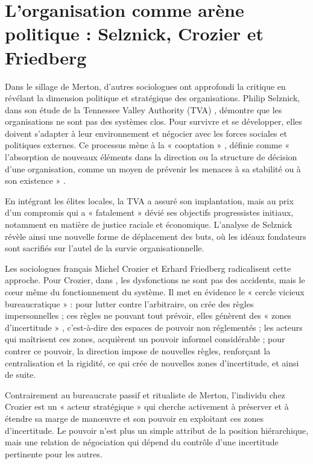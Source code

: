 \section{L'organisation comme arène politique : Selznick, Crozier et Friedberg}

Dans le sillage de Merton, d'autres sociologues ont approfondi la critique en révélant la dimension politique et stratégique des organisations.
Philip Selznick, dans son étude de la Tennessee Valley Authority (TVA) \citep{Selznick1949}, démontre que les organisations ne sont pas des systèmes clos. Pour survivre et se développer, elles doivent s'adapter à leur environnement et négocier avec les forces sociales et politiques externes. Ce processus mène à la « cooptation » , définie comme « l'absorption de nouveaux éléments dans la direction ou la structure de décision d'une organisation, comme un moyen de prévenir les menaces à sa stabilité ou à son existence » .

En intégrant les élites locales, la TVA a assuré son implantation, mais au prix d'un compromis qui a « fatalement »  dévié ses objectifs progressistes initiaux, notamment en matière de justice raciale et économique. L'analyse de Selznick révèle ainsi une nouvelle forme de déplacement des buts, où les idéaux fondateurs sont sacrifiés sur l'autel de la survie organisationnelle.

Les sociologues français Michel Crozier et Erhard Friedberg radicalisent cette approche. Pour Crozier, dans \citep{Crozier1963}, les dysfonctions ne sont pas des accidents, mais le cœur même du fonctionnement du système. Il met en évidence le « cercle vicieux bureaucratique »  : pour lutter contre l'arbitraire, on crée des règles impersonnelles ; ces règles ne pouvant tout prévoir, elles génèrent des « zones d'incertitude » , c'est-à-dire des espaces de pouvoir non réglementés ; les acteurs qui maîtrisent ces zones, acquièrent un pouvoir informel considérable ; pour contrer ce pouvoir, la direction impose de nouvelles règles, renforçant la centralisation et la rigidité, ce qui crée de nouvelles zones d'incertitude, et ainsi de suite.

Contrairement au bureaucrate passif et ritualiste de Merton, l'individu chez Crozier est un « acteur stratégique »  qui cherche activement à préserver et à étendre sa marge de manœuvre et son pouvoir en exploitant ces zones d'incertitude. Le pouvoir n'est plus un simple attribut de la position hiérarchique, mais une relation de négociation qui dépend du contrôle d'une incertitude pertinente pour les autres.


